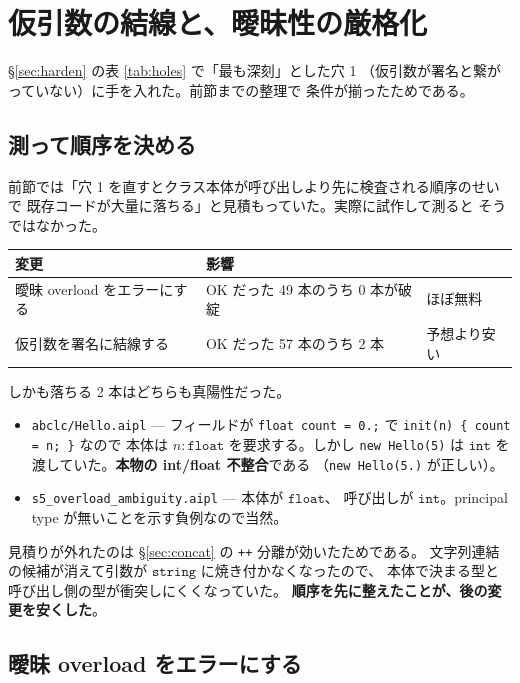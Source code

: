 \documentclass[11pt,a4paper]{ltjsarticle}
\theoremstyle{definition}
\theoremstyle{remark}
\newcommand{\ty}[1]{\ensuremath{\mathtt{#1}}}
\begin{document}
\section{仮引数の結線と、曖昧性の厳格化}
\label{sec:wiring}

\S\ref{sec:harden} の表 \ref{tab:holes} で「最も深刻」とした穴 1
（仮引数が署名と繋がっていない）に手を入れた。前節までの整理で
条件が揃ったためである。

\subsection{測って順序を決める}

前節では「穴 1 を直すとクラス本体が呼び出しより先に検査される順序のせいで
既存コードが大量に落ちる」と見積もっていた。実際に試作して測ると
そうではなかった。

\begin{center}
\begin{tabular}{lll}
\toprule
変更 & 影響 & \\
\midrule
曖昧 overload をエラーにする & OK だった 49 本のうち 0 本が破綻 & ほぼ無料 \\
仮引数を署名に結線する       & OK だった 57 本のうち 2 本         & 予想より安い \\
\bottomrule
\end{tabular}
\end{center}

しかも落ちる 2 本はどちらも真陽性だった。

\begin{itemize}
\item \texttt{abclc/Hello.aipl} --- フィールドが
  \texttt{float count = 0.;} で \texttt{init(n) \{ count = n; \}} なので
  本体は $n : \ty{float}$ を要求する。しかし \texttt{new Hello(5)} は
  \ty{int} を渡していた。\textbf{本物の int/float 不整合}である
  （\texttt{new Hello(5.)} が正しい）。
\item \texttt{s5\_overload\_ambiguity.aipl} --- 本体が \ty{float}、
  呼び出しが \ty{int}。principal type が無いことを示す負例なので当然。
\end{itemize}

見積りが外れたのは \S\ref{sec:concat} の \texttt{++} 分離が効いたためである。
文字列連結の候補が消えて引数が \ty{string} に焼き付かなくなったので、
本体で決まる型と呼び出し側の型が衝突しにくくなっていた。
\textbf{順序を先に整えたことが、後の変更を安くした}。

\subsection{曖昧 overload をエラーにする}
\end{document}
